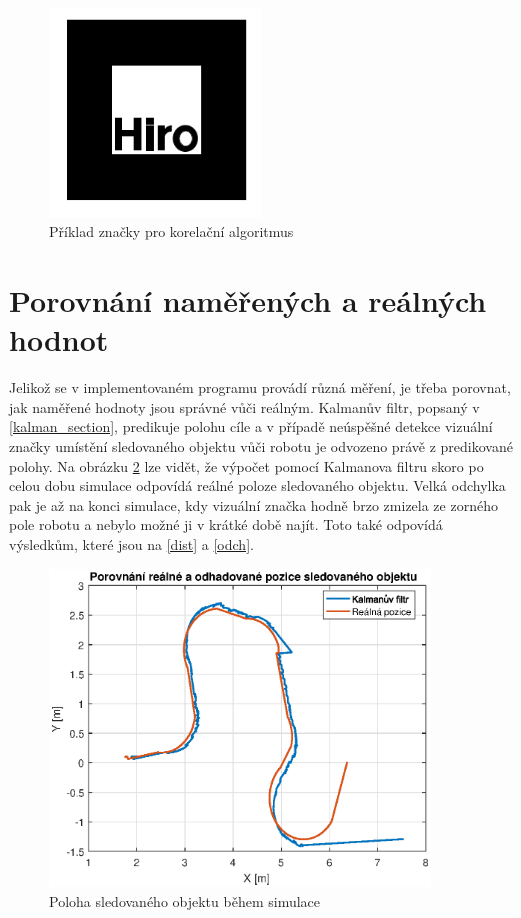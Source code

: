\documentclass[twoside]{ctuthesis}
\theoremstyle{plain}
\theoremstyle{definition}
\theoremstyle{note}
\begin{document}
\begin{figure}
	\caption{Příklad značky pro korelační algoritmus}
	
	\label{hiro}
	\includegraphics[width=0.5\textwidth]{images/5/r1301.jpg}
\end{figure}

\section{Porovnání naměřených a reálných hodnot}

Jelikož se v implementovaném programu provádí různá měření, je třeba porovnat, jak naměřené hodnoty jsou správné vůči reálným. Kalmanův filtr, popsaný v \ref{kalman_section}, predikuje polohu cíle a v případě neúspěšné detekce vizuální značky umístění sledovaného objektu vůči robotu je odvozeno právě z predikované polohy. Na obrázku \ref{sled} lze vidět, že výpočet pomocí Kalmanova filtru skoro po celou dobu simulace odpovídá reálné poloze sledovaného objektu. Velká odchylka pak je až na konci simulace, kdy vizuální značka hodně brzo zmizela ze zorného pole robotu a nebylo možné ji v krátké době najít. Toto také odpovídá výsledkům, které jsou na \ref{dist} a \ref{odch}.


\begin{figure}
	\caption{Poloha sledovaného objektu během simulace}
	
	\label{sled}
	\includegraphics[width=0.9\textwidth]{images/5/pos_pioner.eps}
\end{figure}
\end{document}
